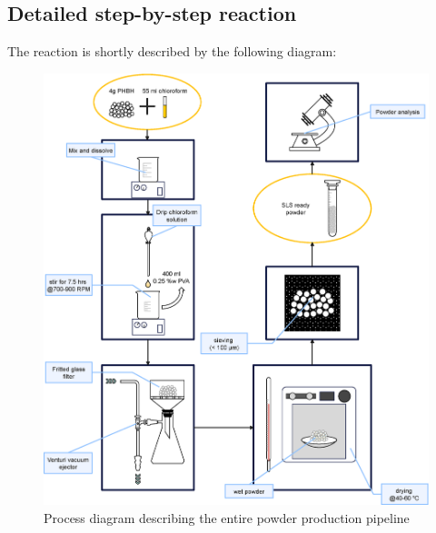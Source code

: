 \documentclass{article}
\begin{document}
%
%



        \subsection{Detailed step-by-step reaction\label{detailed_reaction}}

        The reaction is shortly described by the following diagram: 

            \begin{figure}[h!]
                \centering
                \includegraphics[width=\textwidth]{Pictures/process_diagram.eps}
                \caption{Process diagram describing the entire powder production pipeline \autocite{Inkscape}}
                \label{fig:process_diagram}
            \end{figure}
\end{document}
